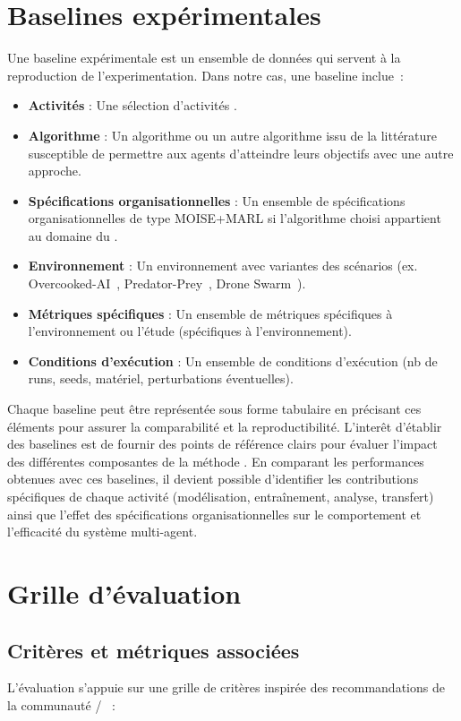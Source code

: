 \section{Baselines expérimentales}

Une baseline expérimentale est un ensemble de données qui servent à la reproduction de l'experimentation. Dans notre cas, une baseline inclue~:
\begin{itemize}
  \item \textbf{Activités} : Une sélection d'activités .
  \item \textbf{Algorithme} : Un algorithme  ou un autre algorithme issu de la littérature susceptible de permettre aux agents d'atteindre leurs objectifs avec une autre approche.
  \item \textbf{Spécifications organisationnelles} : Un ensemble de spécifications organisationnelles de type MOISE+MARL si l'algorithme choisi appartient au domaine du .
  \item \textbf{Environnement} : Un environnement avec variantes des scénarios (ex. Overcooked-AI~\cite{overcookedai}, Predator-Prey~\cite{lowe2017multi}, Drone Swarm~\cite{cage_challenge_3_announcement}).
  \item \textbf{Métriques spécifiques} : Un ensemble de métriques spécifiques à l'environnement ou l'étude (spécifiques à l'environnement).
  \item \textbf{Conditions d'exécution} : Un ensemble de conditions d'exécution (nb de runs, seeds, matériel, perturbations éventuelles).
\end{itemize}

Chaque baseline peut être représentée sous forme tabulaire en précisant ces éléments pour assurer la comparabilité et la reproductibilité. L'interêt d'établir des baselines est de fournir des points de référence clairs pour évaluer l'impact des différentes composantes de la méthode . En comparant les performances obtenues avec ces baselines, il devient possible d'identifier les contributions spécifiques de chaque activité (modélisation, entraînement, analyse, transfert) ainsi que l'effet des spécifications organisationnelles sur le comportement et l'efficacité du système multi-agent.

\section{Grille d'évaluation}\label{sec:evaluation_grid}

\subsection{Critères et métriques associées}\label{sec:criteria_metrics}
L'évaluation s'appuie sur une grille de critères inspirée des recommandations de la communauté /~\cite{papoudakis2021agent} :

